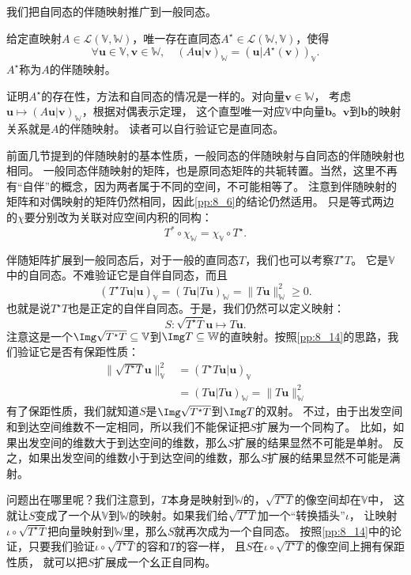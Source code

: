 \documentclass[12pt,UTF8]{ctexbook}
\begin{document}
我们把自同态的伴随映射推广到一般同态。
\begin{pp}\label{pp:8_16}
    给定直映射$A\in\mathcal{L}(\mathbb{V}, \mathbb{W})$，唯一存在直同态$A^\star \in \mathcal{L}(\mathbb{W}, \mathbb{V})$，使得
    $$ \forall \mathbf{u}\in\mathbb{V}, \mathbf{v}\in\mathbb{W}, \quad (A\mathbf{u} | \mathbf{v})_\mathbb{W} = (\mathbf{u} | A^\star(\mathbf{v}))_\mathbb{V}. $$
    $A^\star$称为$A$的伴随映射。
\end{pp}
证明$A^\star$的存在性，方法和自同态的情况是一样的。对向量$\mathbf{v}\in\mathbb{W}$，
考虑$\mathbf{u} \mapsto (A\mathbf{u}|\mathbf{v})_\mathbb{W}$，根据对偶表示定理，
这个直型唯一对应$\mathbb{V}$中向量$\mathbf{b}$。$\mathbf{v}$到$\mathbf{b}$的映射关系就是$A$的伴随映射。
读者可以自行验证它是直同态。

前面几节提到的伴随映射的基本性质，一般同态的伴随映射与自同态的伴随映射也相同。
一般同态伴随映射的矩阵，也是原同态矩阵的共轭转置。当然，这里不再有“自伴”的概念，因为两者属于不同的空间，不可能相等了。
注意到伴随映射的矩阵和对偶映射的矩阵仍然相同，因此\ref{pp:8_6}的结论仍然适用。
只是等式两边的$\chi$要分别改为关联对应空间内积的同构：
$$ T^* \circ \chi_\mathbb{W} = \chi_\mathbb{V} \circ T^\star. $$

伴随矩阵扩展到一般同态后，对于一般的直同态$T$，我们也可以考察$T^\star T$。
它是$\mathbb{V}$中的自同态。不难验证它是自伴自同态，而且
$$ (T^\star T\mathbf{u}|\mathbf{u})_\mathbb{V} = (T\mathbf{u}|T\mathbf{u})_\mathbb{W} = \| T\mathbf{u} \|_\mathbb{W}^2 \geqslant 0. $$
也就是说$T^\star T$也是正定的自伴自同态。于是，我们仍然可以定义映射：
$$ S : \sqrt{T^\star T} \mathbf{u} \mapsto T\mathbf{u}. $$
注意这是一个$\Img \sqrt{T^\star T}\subseteq\mathbb{V}$到$\Img T\subseteq\mathbb{W}$的直映射。按照\ref{pp:8_14}的思路，我们验证它是否有保距性质：
\begin{align*}
    \|\sqrt{T^\star T} \mathbf{u}\|_\mathbb{V}^2 &= (T^\star T\mathbf{u}|\mathbf{u})_\mathbb{V}  \\
    &= (T\mathbf{u}|T\mathbf{u})_\mathbb{W} = \| T\mathbf{u} \|_\mathbb{W}^2  
\end{align*}
有了保距性质，我们就知道$S$是$\Img \sqrt{T^\star T}$到$\Img T$的双射。
不过，由于出发空间和到达空间维数不一定相同，所以我们不能保证把$S$扩展为一个同构了。
比如，如果出发空间的维数大于到达空间的维数，那么$S$扩展的结果显然不可能是单射。
反之，如果出发空间的维数小于到达空间的维数，那么$S$扩展的结果显然不可能是满射。

问题出在哪里呢？我们注意到，$T$本身是映射到$\mathbb{W}$的，$\sqrt{T^\star T}$的像空间却在$\mathbb{V}$中，
这就让$S$变成了一个从$\mathbb{V}$到$\mathbb{W}$的映射。如果我们给$\sqrt{T^\star T}$加一个“转换插头”$\iota$，
让映射$\iota \circ \sqrt{T^\star T}$把向量映射到$\mathbb{W}$里，那么$S$就再次成为一个自同态。
按照\ref{pp:8_14}中的论证，只要我们验证$\iota \circ \sqrt{T^\star T}$的容和$T$的容一样，
且$S$在$\iota \circ \sqrt{T^\star T}$的像空间上拥有保距性质，
就可以把$S$扩展成一个幺正自同构。
\end{document}
